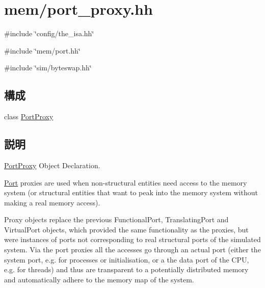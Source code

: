 \hypertarget{port__proxy_8hh}{
\section{mem/port\_\-proxy.hh}
\label{port__proxy_8hh}
}
{\ttfamily \#include \char`\"{}config/the\_\-isa.hh\char`\"{}}\par
{\ttfamily \#include \char`\"{}mem/port.hh\char`\"{}}\par
{\ttfamily \#include \char`\"{}sim/byteswap.hh\char`\"{}}\par
\subsection*{構成}
\begin{DoxyCompactItemize}
\item 
class \hyperlink{classPortProxy}{PortProxy}
\end{DoxyCompactItemize}


\subsection{説明}
\hyperlink{classPortProxy}{PortProxy} Object Declaration.

\hyperlink{classPort}{Port} proxies are used when non-\/structural entities need access to the memory system (or structural entities that want to peak into the memory system without making a real memory access).

Proxy objects replace the previous FunctionalPort, TranslatingPort and VirtualPort objects, which provided the same functionality as the proxies, but were instances of ports not corresponding to real structural ports of the simulated system. Via the port proxies all the accesses go through an actual port (either the system port, e.g. for processes or initialisation, or a the data port of the CPU, e.g. for threads) and thus are transparent to a potentially distributed memory and automatically adhere to the memory map of the system. 